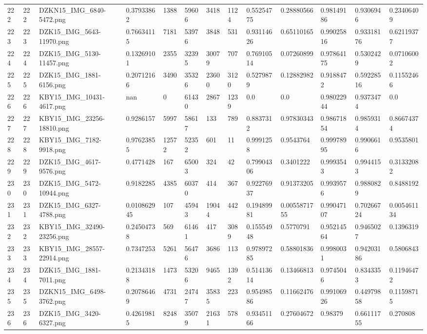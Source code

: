 \documentclass[11pt, a4paper, twoside]{report}
\begin{document}
\begin{longtable}[c]{@{}lllllllllllll@{}}
222 & 222 & DZKN15\_IMG\_6840-5472.png & 0.37933862 & 1388 & 59606 & 3418 & 1124 & 0.55254775 & 0.28880566 & 0.98149186 & 0.9306946 & 0.23406409 \\
223 & 223 & DZK15\_IMG\_5643-11970.png & 0.76634115 & 7181 & 53976 & 3848 & 531 & 0.93114626 & 0.65110165 & 0.99025816 & 0.93318176 & 0.62119377 \\
224 & 224 & DZK15\_IMG\_5130-11457.png & 0.13269101 & 2355 & 32395 & 30079 & 707 & 0.76910514 & 0.07260899 & 0.97864175 & 0.5302429 & 0.07106002 \\
225 & 225 & DZK15\_IMG\_1881-6156.png & 0.20712166 & 3490 & 35326 & 23600 & 3120 & 0.5279879 & 0.12882982 & 0.9188472 & 0.59228516 & 0.11552466 \\
226 & 226 & KBY15\_IMG\_10431-4617.png & nan & 0 & 61430 & 2867 & 1239 & 0.0 & 0.0 & 0.98022944 & 0.9373474 & 0.0 \\
227 & 227 & KBY15\_IMG\_23256-18810.png & 0.9286157 & 5997 & 58617 & 133 & 789 & 0.8837312 & 0.97830343 & 0.98671854 & 0.9859314 & 0.86674374 \\
228 & 228 & KBY15\_IMG\_7182-9918.png & 0.97623855 & 12572 & 52352 & 601 & 11 & 0.9991258 & 0.9543764 & 0.99978995 & 0.9906616 & 0.9535801 \\
229 & 229 & DZK15\_IMG\_4617-9576.png & 0.4771428 & 167 & 65003 & 324 & 42 & 0.79904306 & 0.3401222 & 0.9993543 & 0.9944153 & 0.31332082 \\
230 & 230 & DZK15\_IMG\_5472-10944.png & 0.9182285 & 4385 & 60370 & 414 & 367 & 0.92276937 & 0.91373205 & 0.9939576 & 0.9880829 & 0.8488192 \\
231 & 231 & DZK15\_IMG\_6327-4788.png & 0.010862945 & 107 & 45943 & 19044 & 442 & 0.19489981 & 0.0055871755 & 0.99047107 & 0.70266724 & 0.005461134 \\
232 & 232 & KBY15\_IMG\_32490-23256.png & 0.24504738 & 569 & 61461 & 417 & 3089 & 0.15554948 & 0.5770791 & 0.95214564 & 0.9465027 & 0.1396319 \\
233 & 233 & KBY15\_IMG\_28557-22914.png & 0.7347253 & 5261 & 56476 & 3686 & 113 & 0.97897285 & 0.58801836 & 0.9980031 & 0.94203186 & 0.5806843 \\
234 & 234 & DZK15\_IMG\_1881-7011.png & 0.21343188 & 1473 & 53206 & 9465 & 1392 & 0.51413614 & 0.13466813 & 0.9745046 & 0.8343353 & 0.11946472 \\
235 & 235 & DZKN15\_IMG\_6498-3762.png & 0.20786469 & 4731 & 24747 & 35835 & 223 & 0.95498586 & 0.11662476 & 0.99106926 & 0.44979858 & 0.11598715 \\
236 & 236 & DZK15\_IMG\_3420-6327.png & 0.42619815 & 8248 & 35079 & 21631 & 578 & 0.93451166 & 0.27604672 & 0.98379 & 0.66111755 & 0.270808 \\

\end{longtable}
\end{document}
